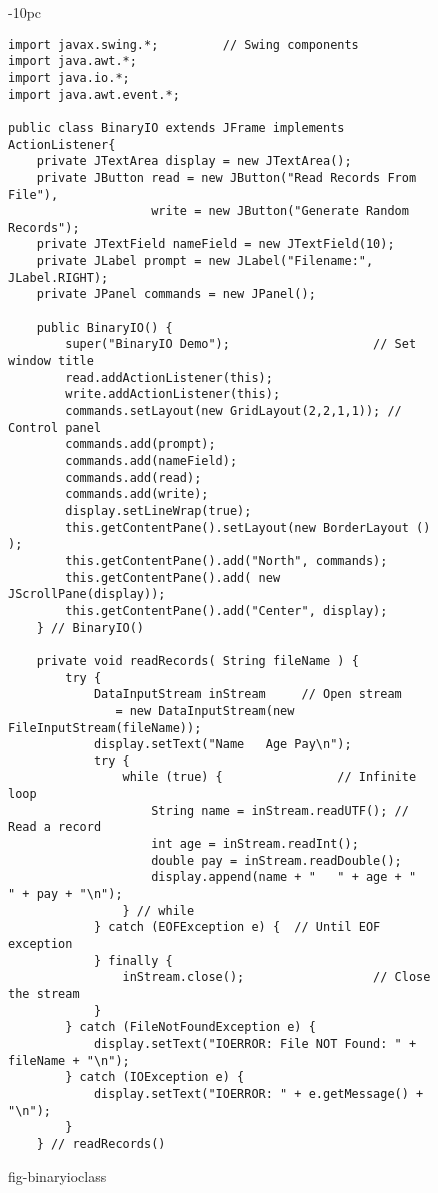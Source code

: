 \begin{figure}[p]
\jjjprogstart
\begin{jjjlistingleft}[36pc]{-10pc}
\begin{lstlisting}
import javax.swing.*;         // Swing components
import java.awt.*;
import java.io.*;
import java.awt.event.*;

public class BinaryIO extends JFrame implements ActionListener{
    private JTextArea display = new JTextArea();
    private JButton read = new JButton("Read Records From File"),
                    write = new JButton("Generate Random Records");
    private JTextField nameField = new JTextField(10);
    private JLabel prompt = new JLabel("Filename:", JLabel.RIGHT);
    private JPanel commands = new JPanel();

    public BinaryIO() {
        super("BinaryIO Demo");                    // Set window title
        read.addActionListener(this);
        write.addActionListener(this);
        commands.setLayout(new GridLayout(2,2,1,1)); // Control panel
        commands.add(prompt);
        commands.add(nameField);
        commands.add(read);
        commands.add(write);
        display.setLineWrap(true);
        this.getContentPane().setLayout(new BorderLayout () );
        this.getContentPane().add("North", commands);
        this.getContentPane().add( new JScrollPane(display));
        this.getContentPane().add("Center", display);
    } // BinaryIO()

    private void readRecords( String fileName ) {
        try {
            DataInputStream inStream     // Open stream
               = new DataInputStream(new FileInputStream(fileName)); 
            display.setText("Name   Age Pay\n");
            try {
                while (true) {                // Infinite loop
                    String name = inStream.readUTF(); // Read a record
                    int age = inStream.readInt();
                    double pay = inStream.readDouble();
                    display.append(name + "   " + age + "   " + pay + "\n");
                } // while
            } catch (EOFException e) {  // Until EOF exception
            } finally {
                inStream.close();                  // Close the stream
            }
        } catch (FileNotFoundException e) {
            display.setText("IOERROR: File NOT Found: " + fileName + "\n");
        } catch (IOException e) {
            display.setText("IOERROR: " + e.getMessage() + "\n");
        }
    } // readRecords()
\end{lstlisting}
\end{jjjlistingleft}
{fig-binaryioclass}
\end{figure}


